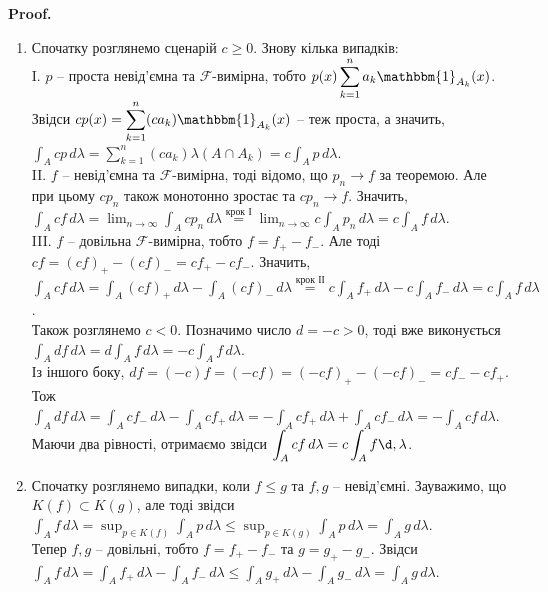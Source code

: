 \documentclass[a4paper, 10pt]{article}
\makeatletter
\theoremstyle{theoremdd}
\renewenvironment{proof}[1][Proof.\\]{\par
\pushQED{\hfill \qed}%
\normalfont \topsep6\p@\@plus6\p@\relax
\trivlist
\item\relax
{\bfseries
#1\@addpunct{.}}\hspace\labelsep\ignorespaces
}{%
\popQED\endtrivlist\@endpefalse
}
\makeatother
\begin{document}
\begin{proof}
\begin{enumerate}[wide=0pt,label={\arabic*)}]
\item Спочатку розглянемо сценарій $c \geq 0$. Знову кілька випадків:\\
I. $p$ -- проста невід'ємна та $\mathcal{F}$-вимірна, тобто $p(x) \displaystyle\sum_{k=1}^n a_k\mathbbm{1}_{A_k}(x)$. Звідси $c p(x) = \displaystyle\sum_{k=1}^n (ca_k) \mathbbm{1}_{A_k}(x)$ -- теж проста, а значить, $\displaystyle\int_A cp\,d\lambda = \sum_{k=1}^n (ca_k) \lambda(A \cap A_k) = c \int_A p\,d\lambda$.\\
II. $f$ -- невід'ємна та $\mathcal{F}$-вимірна, тоді відомо, що $p_n \to f$ за теоремою. Але при цьому $c p_n$ також монотонно зростає та $c p_n \to f$. Значить, $\displaystyle\int_A cf\,d\lambda = \lim_{n \to \infty} \int_A cp_n\,d\lambda \overset{\text{крок І}}{=} \lim_{n \to \infty} c \int_A p_n\,d\lambda = c \int_A f\,d\lambda$.\\
III. $f$ -- довільна $\mathcal{F}$-вимірна, тобто $f = f_+ - f_-$. Але тоді $cf = (cf)_+ - (cf)_- = c f_+ - cf_-$. Значить,\\
$\displaystyle\int_A cf\,d\lambda = \int_A (cf)_+\,d\lambda - \int_A (cf)_-\,d\lambda \overset{\text{крок ІІ}}{=} c \int_A f_+\,d\lambda - c \int_A f_-\,d\lambda = c \int_A f\,d\lambda$.
\bigskip \\
Також розглянемо $c < 0$. Позначимо число $d = -c > 0$, тоді вже виконується \\ $\displaystyle\int_A df \,d\lambda = d \int_A f\,d\lambda = -c \int_A f\,d\lambda$.\\
Із іншого боку, $df = (-c)f = (-cf) = (-cf)_+ - (-cf)_- = cf_- - cf_+$. Тож\\
$\displaystyle\int_A df\,d\lambda = \int_A cf_-\,d\lambda - \int_A cf_+\,d\lambda = - \int_A cf_+\,d\lambda + \int_A cf_-\,d\lambda = - \int_A cf\,d\lambda$.\\
Маючи два рівності, отримаємо звідси $\displaystyle\int_A cf\,d\lambda = c\int_A f\d,\lambda$.

\item Спочатку розглянемо випадки, коли $f \leq g$ та $f,g$ -- невід'ємні. Зауважимо, що $K(f) \subset K(g)$, але тоді звідси $\displaystyle\int_A f\,d\lambda = \sup_{p \in K(f)} \int_A p\,d\lambda \leq \sup_{p \in K(g)} \int_A p\,d\lambda = \int_A g\,d\lambda$.\\
Тепер $f,g$ -- довільні, тобто $f = f_+ - f_-$ та $g = g_+ - g_-$. Звідси\\
$\displaystyle\int_A f\,d\lambda = \int_A f_+\,d\lambda - \int_A f_-\,d\lambda \leq \int_A g_+\,d\lambda - \int_A g_-\,d\lambda = \int_A g\,d\lambda$.


\end{enumerate}
\end{proof}
\end{document}

